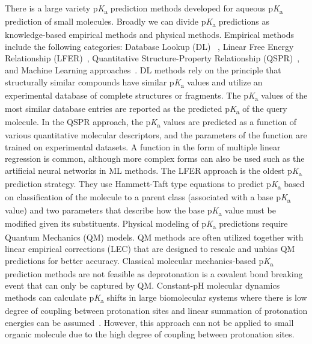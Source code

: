 \documentclass[9pt,lineno,final]{elife}
\newcommand{\pKa}{p\textit{K}\textsubscript{a}}
\begin{document}
There is a large variety \pKa{} prediction methods developed for aqueous \pKa{} prediction of small molecules. Broadly we can divide \pKa{} predictions as knowledge-based empirical methods and physical methods. Empirical methods include the following categories: Database Lookup (DL) ~\citep{Kogej_Muresan_2005}, Linear Free Energy Relationship (LFER)~\citep{PerrinDDpaPf, Hammett_1940, Taft:1959:J.Am.Chem.Soc.}, Quantitative Structure-Property Relationship (QSPR)~\citep{Xing:2003:J.Chem.Inf.Comput.Sci., Zhang:2006:J.Chem.Inf.Model., Cruciani:2009:Chem.Biodivers., Milletti:2007:J.Chem.Inf.Model.}, and Machine Learning approaches~\citep{Fraczkiewicz:2013:ReferenceModuleinChemistryMolecularSciencesandChemicalEngineering, simulation-plus-pKa}. DL methods rely on the principle that structurally similar compounds have similar \pKa{} values and utilize an experimental database of complete structures or fragments. The \pKa{} values of the most similar database entries are reported as the predicted \pKa{} of the query molecule.
In the QSPR approach, the \pKa{} values are predicted as a function of various quantitative molecular descriptors, and the parameters of the function are trained on experimental datasets. A function in the form of multiple linear regression is common, although more complex forms can also be used such as the artificial neural networks in ML methods.
The LFER approach is the oldest \pKa{} prediction strategy. They use Hammett-Taft type equations to predict \pKa{} based on classification of the molecule to a parent class (associated with a base \pKa{} value) and two parameters that describe how the base \pKa{} value must be modified given its substituents. 
Physical modeling of \pKa{} predictions require Quantum Mechanics (QM) models. QM methods are often utilized together with linear empirical corrections (LEC) that are designed to rescale and unbias QM predictions for better accuracy. Classical molecular mechanics-based \pKa{} prediction methods are not feasible as deprotonation is a covalent bond breaking event that can only be captured by QM. Constant-pH molecular dynamics methods can calculate \pKa{} shifts in large biomolecular systems where there is low degree of coupling between protonation sites and linear summation of protonation energies can be assumed~\citep{Radak:2017:J.Chem.TheoryComput.}. However, this approach can not be applied to small organic molecule due to the high degree of coupling between protonation sites. 


\end{document}
